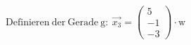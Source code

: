 \documentclass[preview]{standalone}
\begin{document}
\begin{center}
$\mathrm{Definieren \: der \: Gerade \: g: } \: \vec{x_3} = \begin{pmatrix} 5 \\ -1 \\ -3 \end{pmatrix} \cdot \mathrm{w}$
\end{center}
\end{document}
